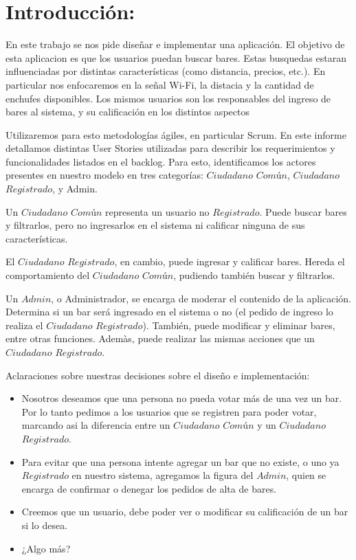 \section{Introducción:}

En este trabajo se nos pide diseñar e implementar una aplicación. El objetivo de esta aplicacion es que los usuarios puedan buscar bares. Estas busquedas estaran influenciadas por distintas características (como distancia, precios, etc.). En particular nos enfocaremos en la señal Wi-Fi, la distacia y la cantidad de enchufes disponibles. Los mismos usuarios son los responsables del ingreso de bares al sistema, y su calificación en los distintos aspectos

Utilizaremos para esto metodologías ágiles, en particular Scrum. En este informe detallamos distintas User Stories utilizadas para describir los requerimientos y funcionalidades listados en el backlog. Para esto, identificamos los actores presentes en nuestro modelo en tres categorías: $Ciudadano$ $Común$, $Ciudadano$ $Registrado$, y Admin.

Un $Ciudadano$ $Común$ representa un usuario no $Registrado$. Puede buscar bares y filtrarlos, pero no ingresarlos en el sistema ni calificar ninguna de sus características.

El $Ciudadano$ $Registrado$, en cambio, puede ingresar y calificar bares. Hereda el comportamiento del $Ciudadano$ $Común$, pudiendo también buscar y filtrarlos.

Un $Admin$, o Administrador, se encarga de moderar el contenido de la aplicación. Determina si un bar será ingresado en el sistema o no (el pedido de ingreso lo realiza el $Ciudadano$ $Registrado$). También, puede modificar y eliminar bares, entre otras funciones. Ademàs, puede realizar las mismas acciones que un $Ciudadano$ $Registrado$.


Aclaraciones sobre nuestras decisiones sobre el diseño e implementación:
\begin{itemize}

\item Nosotros deseamos que una persona no pueda votar más de una vez un bar. Por lo tanto pedimos a los usuarios que se registren para poder votar, marcando asi la diferencia entre un $Ciudadano$ $Común$ y un $Ciudadano$ $Registrado$. 

\item Para evitar que una persona intente agregar un bar que no existe, o uno ya $Registrado$ en nuestro sistema, agregamos la figura del $Admin$, quien se encarga de confirmar o denegar los pedidos de alta de bares.

\item Creemos que un usuario, debe poder ver o modificar su calificación de un bar si lo desea. 

\item \huge{¿Algo más?}

\end{itemize}
